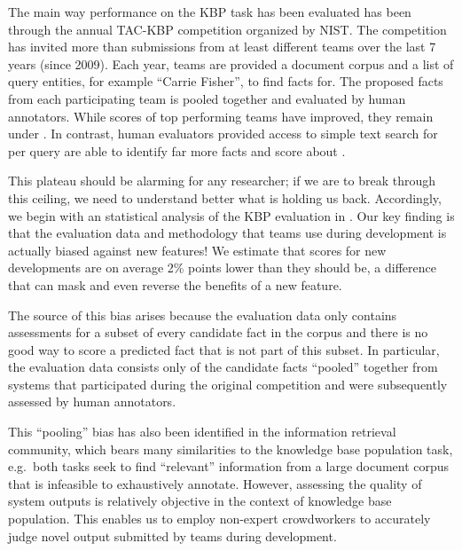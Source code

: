 The main way performance on the KBP task has been evaluated has been through the annual TAC-KBP competition organized by NIST.\@
The competition has invited more than  submissions from at least  different teams over the last 7 years (since 2009).
Each year, teams are provided a document corpus and a list of query entities, for example ``Carrie Fisher'', to find facts for.
The proposed facts from each participating team is pooled together and evaluated by human annotators.
While scores of top performing teams have improved, they remain under .
In contrast, human evaluators provided access to simple text search for  per query are able to identify far more facts and score about .

This plateau should be alarming for any researcher; if we are to break through this ceiling, we need to understand better what is holding us back.
Accordingly, we begin with an statistical analysis of the KBP evaluation in .
Our key finding is that the evaluation data and methodology that teams use during development is actually biased against new features!
We estimate that scores for new developments are on average 2\% points lower than they should be, a difference that can mask and even reverse the benefits of a new feature.

The source of this bias arises because 
the evaluation data only contains assessments for a subset of every candidate fact in the corpus
and there is no good way to score a predicted fact that is not part of this subset.
In particular, the evaluation data consists only of the candidate facts ``pooled'' together from systems that participated during the original competition and were subsequently assessed by human annotators.

This ``pooling'' bias has also been identified in the information retrieval community\needcite, which bears many similarities to the knowledge base population task, e.g.\ both tasks seek to find ``relevant'' information from a large document corpus that is infeasible to exhaustively annotate.
However, assessing the quality of system outputs is relatively objective in the context of knowledge base population.
This enables us to employ non-expert crowdworkers to accurately judge novel output submitted by teams during development.

